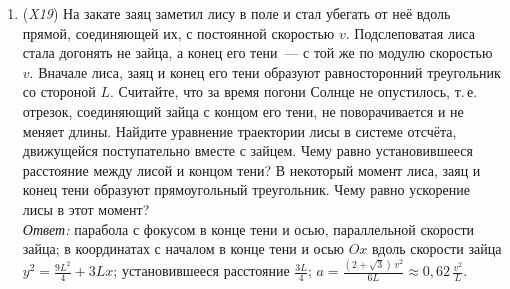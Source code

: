 \documentclass[../main.tex]{subfiles}
\begin{document}
\begin{enumerate}
  \item (\textit{X19}) На закате заяц заметил лису в поле и стал убегать от неё вдоль
  прямой, соединяющей их, с постоянной скоростью $v$. Подслеповатая лиса стала
  догонять не зайца, а конец его тени~--- с той же по модулю скоростью $v$. Вначале
  лиса, заяц и конец его тени образуют равносторонний треугольник со стороной $L$.
  Считайте, что за время погони Солнце не опустилось, т.\,е. отрезок, соединяющий
  зайца с концом его тени, не поворачивается и не меняет длины. Найдите уравнение
  траектории лисы в системе отсчёта, движущейся поступательно вместе с зайцем. Чему
  равно установившееся расстояние между лисой и концом тени? В некоторый момент лиса,
  заяц и конец тени образуют прямоугольный треугольник. Чему равно ускорение лисы в
  этот момент?\\
  \textit{Ответ:} парабола с фокусом в конце тени и осью, параллельной скорости зайца;
  в координатах с началом в конце тени и осью $Ox$ вдоль скорости зайца
  $y^2 = \frac{9L^2}{4} + 3Lx$; установившееся расстояние $\frac{3L}{4}$;
  $a = \frac{(2 + \sqrt{3})\,v^2}{6L} \approx 0{,}62\,\frac{v^2}{L}$.
\end{enumerate}
\end{document}
